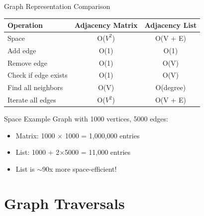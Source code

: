 \documentclass[aspectratio=169,xcolor=dvipsnames]{beamer}
\begin{document}
\begin{frame}{Graph Representation Comparison}
  \begin{table}
    \centering
    \begin{tabular}{l|c|c}
      \toprule
      \textbf{Operation} & \textbf{Adjacency Matrix} & \textbf{Adjacency List} \\
      \midrule
      Space & O($V^2$) & O(V + E) \\
      Add edge & O(1) & O(1) \\
      Remove edge & O(1) & O(V) \\
      Check if edge exists & O(1) & O(V) \\
      Find all neighbors & O(V) & O(degree) \\
      Iterate all edges & O($V^2$) & O(V + E) \\
      \bottomrule
    \end{tabular}
  \end{table}

  \vspace{0.3cm}

  \begin{exampleblock}{Space Example}
    Graph with 1000 vertices, 5000 edges:
    \begin{itemize}
      \item Matrix: 1000 $\times$ 1000 = 1,000,000 entries
      \item List: 1000 + 2$\times$5000 = 11,000 entries
      \item List is $\sim$90x more space-efficient!
    \end{itemize}
  \end{exampleblock}
\end{frame}

\section{Graph Traversals}
\end{document}
